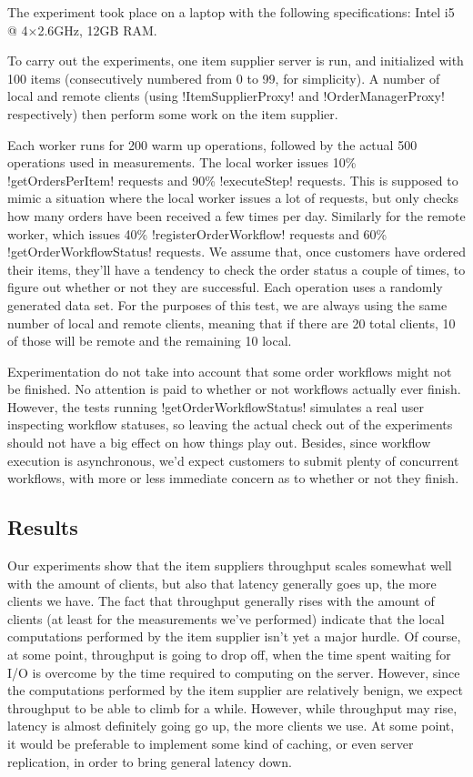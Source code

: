 \documentclass[a4paper, 12pt]{article}
\begin{document}
The experiment took place on a laptop with the following
specifications: Intel i5 @ 4$\times$2.6GHz, 12GB RAM.

To carry out the experiments, one item supplier server is run, and
initialized with 100 items (consecutively numbered from 0 to 99, for
simplicity). A number of local and remote clients (using
!ItemSupplierProxy! and !OrderManagerProxy! respectively) then perform
some work on the item supplier.

Each worker runs for 200 warm up operations, followed by the actual
500 operations used in measurements. The local worker issues 10\%
!getOrdersPerItem! requests and 90\% !executeStep! requests. This is
supposed to mimic a situation where the local worker issues a lot of
requests, but only checks how many orders have been received a few
times per day. Similarly for the remote worker, which issues 40\%
!registerOrderWorkflow! requests and 60\% !getOrderWorkflowStatus!
requests. We assume that, once customers have ordered their items,
they'll have a tendency to check the order status a couple of times,
to figure out whether or not they are successful. Each operation uses
a randomly generated data set. For the purposes of this test, we are
always using the same number of local and remote clients, meaning that
if there are 20 total clients, 10 of those will be remote and the
remaining 10 local.

Experimentation do not take into account that some order workflows
might not be finished. No attention is paid to whether or not
workflows actually ever finish. However, the tests running
!getOrderWorkflowStatus! simulates a real user inspecting workflow
statuses, so leaving the actual check out of the experiments should
not have a big effect on how things play out. Besides, since workflow
execution is asynchronous, we'd expect customers to submit plenty of
concurrent workflows, with more or less immediate concern as to
whether or not they finish.

\subsection*{Results}

Our experiments show that the item suppliers throughput scales
somewhat well with the amount of clients, but also that latency
generally goes up, the more clients we have. The fact that throughput
generally rises with the amount of clients (at least for the
measurements we've performed) indicate that the local computations
performed by the item supplier isn't yet a major hurdle. Of course, at
some point, throughput is going to drop off, when the time spent
waiting for I/O is overcome by the time required to computing on the
server. However, since the computations performed by the item supplier
are relatively benign, we expect throughput to be able to climb for a
while. However, while throughput may rise, latency is almost
definitely going go up, the more clients we use. At some point, it
would be preferable to implement some kind of caching, or even
server replication, in order to bring general latency down.
\end{document}
